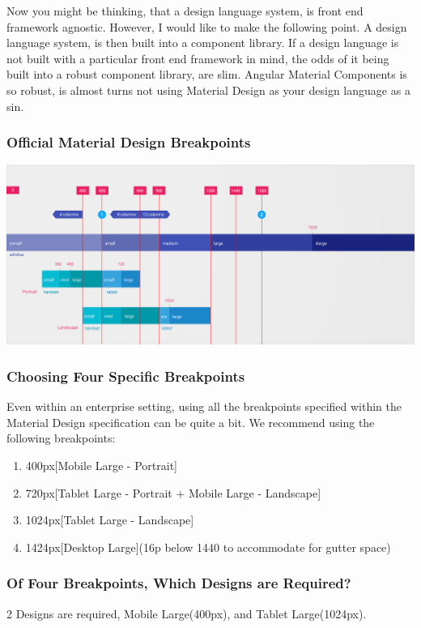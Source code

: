 Now you might be thinking, that a design language system, is front end framework
agnostic. However, I would like to make the following point. A design language
system, is then built into a component library. If a design language is not
built with a particular front end framework in mind, the odds of it being
built into a robust component library, are slim. Angular Material Components is
so robust, is almost turns not using Material Design as your design language as
a sin.

\subsubsection{ Official Material Design Breakpoints }
\includegraphics[scale=0.15]{responsive/layout-adaptive-breakpoints}

\subsubsection{ Choosing Four Specific Breakpoints }
Even within an enterprise setting, using all the breakpoints specified within
the Material Design specification can be quite a bit. We recommend using the
following breakpoints:

\begin{enumerate}
  \item 400px[Mobile Large - Portrait]
  \item 720px[Tablet Large - Portrait + Mobile Large - Landscape]
  \item 1024px[Tablet Large - Landscape]
  \item 1424px[Desktop Large](16p below 1440 to accommodate for gutter space)
\end{enumerate}

\subsubsection{ Of Four Breakpoints, Which Designs are Required? }
2 Designs are required, Mobile Large(400px), and Tablet Large(1024px).

